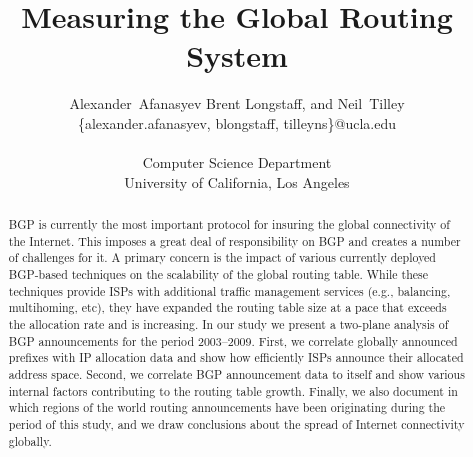 \documentclass[conference]{IEEEtran}%
\title{Measuring the Global Routing System}
\author{Alexander~Afanasyev %
Brent Longstaff, and Neil~Tilley \\ %
\small \{alexander.afanasyev, blongstaff, tilleyns\}@ucla.edu \\ \\
\small Computer Science Department \\
\small University of California, Los Angeles 
}
\begin{document}
\maketitle

\begin{abstract} %

BGP is currently the most important protocol for insuring the global
connectivity of the Internet. This imposes a great deal of responsibility on
BGP and creates a number of challenges for it. A primary concern is the impact
of various currently deployed BGP-based techniques on the scalability of the
global routing table. While these techniques provide ISPs with additional
traffic management services (e.g., balancing, multihoming, etc), they have
expanded the routing table size at a pace that exceeds the allocation rate and
is increasing. In our study we present a two-plane analysis of BGP
announcements for the period 2003--2009. First, we correlate globally
announced prefixes with IP allocation data and show how efficiently ISPs
announce their allocated address space. Second, we correlate BGP announcement
data to itself and show various internal factors contributing to the routing
table growth. Finally, we also document in which regions of the world routing
announcements have been originating during the period of this study, and we
draw conclusions about the spread of Internet connectivity globally.


\end{abstract}











% 
% 



\end{document}
